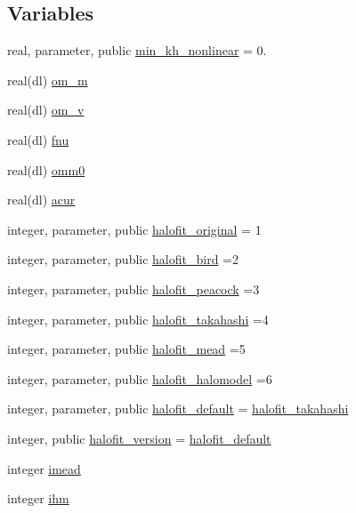 \subsection*{Variables}
\begin{DoxyCompactItemize}
\item 
real, parameter, public \mbox{\hyperlink{namespacenonlinear_a432119e2fd5a90bc8447a4f87c530660}{min\+\_\+kh\+\_\+nonlinear}} = 0.
\item 
real(dl) \mbox{\hyperlink{namespacenonlinear_aabc1c1c2e5484d59aa19897c2312d66e}{om\+\_\+m}}
\item 
real(dl) \mbox{\hyperlink{namespacenonlinear_a5fffe9648c0924743701abc9674d3472}{om\+\_\+v}}
\item 
real(dl) \mbox{\hyperlink{namespacenonlinear_a41cbc8f2a7d3a4a7133a330e7a96f32f}{fnu}}
\item 
real(dl) \mbox{\hyperlink{namespacenonlinear_a95578ad235632d8fd2cc109867cdf329}{omm0}}
\item 
real(dl) \mbox{\hyperlink{namespacenonlinear_a340583ce0b342fc665e8dac4abd41d30}{acur}}
\item 
integer, parameter, public \mbox{\hyperlink{namespacenonlinear_a7df6fbf986bfffb1410f611a9d9da8d8}{halofit\+\_\+original}} = 1
\item 
integer, parameter, public \mbox{\hyperlink{namespacenonlinear_a60a8667a6b76aac6cb917e86e5e813bf}{halofit\+\_\+bird}} =2
\item 
integer, parameter, public \mbox{\hyperlink{namespacenonlinear_af6d944f360abde474ac917e61cc9a10a}{halofit\+\_\+peacock}} =3
\item 
integer, parameter, public \mbox{\hyperlink{namespacenonlinear_aac3355efc27ec1212dfc7d494c94b8bd}{halofit\+\_\+takahashi}} =4
\item 
integer, parameter, public \mbox{\hyperlink{namespacenonlinear_a321ebd41ef62b8c5f49c902695c97100}{halofit\+\_\+mead}} =5
\item 
integer, parameter, public \mbox{\hyperlink{namespacenonlinear_ac93879b4e408404c04347ff8ba8e170c}{halofit\+\_\+halomodel}} =6
\item 
integer, parameter, public \mbox{\hyperlink{namespacenonlinear_a17d0a06b4737dd11deb01679dd462d0d}{halofit\+\_\+default}} = \mbox{\hyperlink{namespacenonlinear_aac3355efc27ec1212dfc7d494c94b8bd}{halofit\+\_\+takahashi}}
\item 
integer, public \mbox{\hyperlink{namespacenonlinear_a1f7f92360f1ca05ad5bc378c6f48c4e2}{halofit\+\_\+version}} = \mbox{\hyperlink{namespacenonlinear_a17d0a06b4737dd11deb01679dd462d0d}{halofit\+\_\+default}}
\item 
integer \mbox{\hyperlink{namespacenonlinear_a4a5afbc21c01819b53e73cca3ae9c9db}{imead}}
\item 
integer \mbox{\hyperlink{namespacenonlinear_aaffe0db71a291d9ca3d9e8315757f6c0}{ihm}}
\end{DoxyCompactItemize}


